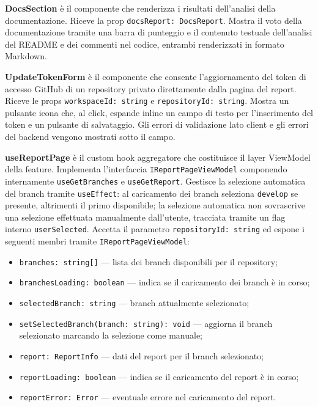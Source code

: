 \documentclass[a4paper, 11pt]{article}
\newcounter{subsubsubsection}[subsubsection]
\newcounter{subsubsubsubsection}[subsubsubsection]
\begin{document}
\textbf{DocsSection} è il componente che renderizza i risultati dell'analisi della
documentazione. Riceve la prop \texttt{docsReport: DocsReport}. Mostra il voto della
documentazione tramite una barra di punteggio e il contenuto testuale dell'analisi del README
e dei commenti nel codice, entrambi renderizzati in formato Markdown.

\textbf{UpdateTokenForm} è il componente che consente l'aggiornamento del token di accesso
GitHub di un repository privato direttamente dalla pagina del report. Riceve le props
\texttt{workspaceId: string} e \texttt{repositoryId: string}. Mostra un pulsante icona che,
al click, espande inline un campo di testo per l'inserimento del token e un pulsante di
salvataggio. Gli errori di validazione lato client e gli errori del backend vengono mostrati
sotto il campo.


\textbf{useReportPage} è il custom hook aggregatore che costituisce il layer ViewModel della
feature. Implementa l'interfaccia \texttt{IReportPageViewModel} componendo internamente
\texttt{useGetBranches} e \texttt{useGetReport}. Gestisce la selezione automatica del branch
tramite \texttt{useEffect}: al caricamento dei branch seleziona \texttt{develop} se presente,
altrimenti il primo disponibile; la selezione automatica non sovrascrive una selezione
effettuata manualmente dall'utente, tracciata tramite un flag interno \texttt{userSelected}.
Accetta il parametro \texttt{repositoryId: string} ed espone i seguenti membri tramite
\texttt{IReportPageViewModel}:
\begin{itemize}
  \item \texttt{branches: string[]} — lista dei branch disponibili per il repository;
  \item \texttt{branchesLoading: boolean} — indica se il caricamento dei branch è in corso;
  \item \texttt{selectedBranch: string} — branch attualmente selezionato;
  \item \texttt{setSelectedBranch(branch: string): void} — aggiorna il branch selezionato
        marcando la selezione come manuale;
  \item \texttt{report: ReportInfo} — dati del report per il branch selezionato;
  \item \texttt{reportLoading: boolean} — indica se il caricamento del report è in corso;
  \item \texttt{reportError: Error} — eventuale errore nel caricamento del report.
\end{itemize}
\end{document}
